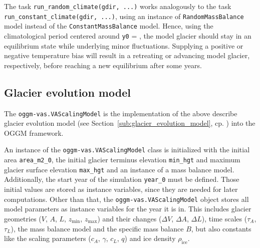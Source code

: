            The task \lstinline`run_random_climate(gdir, ...)` works analogously to the task \lstinline`run_constant_climate(gdir, ...)`, using an instance of \lstinline`RandomMassBalance` model instead of the \lstinline`ConstantMassBalance` model. Hence, using the climatological period centered around \lstinline`y0` = \tstar, the model glacier should stay in an equilibrium state while underlying minor fluctuations. Supplying a positive or negative temperature bias will result in a retreating or advancing model glacier, respectively, before reaching a new equilibrium after some years.
        
    

    \subsection{Glacier evolution model} %
    \label{sub:glacier_evolution_model_implementation}

        The \lstinline`oggm-vas.VAScalingModel` is the implementation of the above describe glacier evolution model (see Section~\ref{sub:glacier_evolution_model}, cp. \citet{Marzeion2012b}) into the OGGM framework.

        An instance of the \lstinline`oggm-vas.VAScalingModel` class is initialized with the initial area \lstinline`area_m2_0`, the initial glacier terminus elevation \lstinline`min_hgt` and maximum glacier surface elevation \lstinline`max_hgt` and an instance of a mass balance model. Additionally, the start year of the simulation \lstinline`year_0` must be defined. Those initial values are stored as instance variables, since they are needed for later computations. Other than that, the \lstinline`oggm-vas.VAScalingModel` object stores all model parameters as instance variables for the year it is in. This includes glacier geometries ($V$, $A$, $L$, $z_\text{min}$, $z_\text{max}$) and their changes ($\Delta V$, $\Delta A$, $\Delta L$), time scales ($\tau_A$, $\tau_L$), the mass balance model and the specific mass balance $B$, but also constants like the scaling parameters ($c_A$, $\gamma$, $c_L$, $q$) and ice density $\rho_\text{ice}$.

